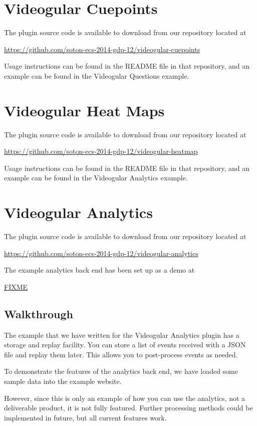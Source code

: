 \documentclass[12pt,a4paper]{article}
\begin{document}
\section{Videogular Cuepoints}

The plugin source code is available to download from our repository located at

\url{https://github.com/soton-ecs-2014-gdp-12/videogular-cuepoints}

Usage instructions can be found in the README file in that repository, and an example can be found in the Videogular Questions example.

\section{Videogular Heat Maps}

The plugin source code is available to download from our repository located at

\url{https://github.com/soton-ecs-2014-gdp-12/videogular-heatmap}

Usage instructions can be found in the README file in that repository, and an example can be found in the Videogular Analytics example.

\section{Videogular Analytics}

The plugin source code is available to download from our repository located at

\url{https://github.com/soton-ecs-2014-gdp-12/videogular-analytics}

The example analytics back end has been set up as a demo at

\url{FIXME}

\subsection{Walkthrough}

The example that we have written for the Videogular Analytics plugin has a storage and replay facility. You can store a list of events received with a JSON file and replay them later. This allows you to post-process events as needed.

To demonstrate the features of the analytics back end, we have loaded some sample data into the example website.

However, since this is only an example of how you can use the analytics, not a deliverable product, it is not fully featured. Further processing methods could be implemented in future, but all current features work.
\end{document}
